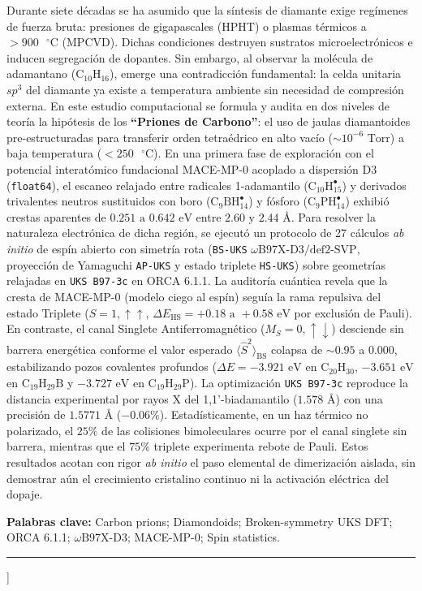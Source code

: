 \documentclass[10pt,twocolumn,a4paper]{article}
\begin{document}
\begin{@twocolumnfalse}
    \small
    Durante siete décadas se ha asumido que la síntesis de diamante exige regímenes de fuerza bruta: presiones de gigapascales (HPHT) o plasmas térmicos a $>900\text{ }^\circ\text{C}$ (MPCVD). Dichas condiciones destruyen sustratos microelectrónicos e inducen segregación de dopantes. Sin embargo, al observar la molécula de adamantano ($\text{C}_{10}\text{H}_{16}$), emerge una contradicción fundamental: la celda unitaria $sp^3$ del diamante ya existe a temperatura ambiente sin necesidad de compresión externa. En este estudio computacional se formula y audita en dos niveles de teoría la hipótesis de los \textbf{``Priones de Carbono''}: el uso de jaulas diamantoides pre-estructuradas para transferir orden tetraédrico en alto vacío ($\sim 10^{-6}\text{ Torr}$) a baja temperatura ($< 250\text{ }^\circ\text{C}$). En una primera fase de exploración con el potencial interatómico fundacional MACE-MP-0 acoplado a dispersión D3 (\texttt{float64}), el escaneo relajado entre radicales 1-adamantilo ($\text{C}_{10}\text{H}_{15}^\bullet$) y derivados trivalentes neutros sustituidos con boro ($\text{C}_9\text{BH}_{14}^\bullet$) y fósforo ($\text{C}_9\text{PH}_{14}^\bullet$) exhibió crestas aparentes de $0.251\text{ a }0.642\text{ eV}$ entre $2.60\text{ y }2.44\text{ \AA}$. Para resolver la naturaleza electrónica de dicha región, se ejecutó un protocolo de 27 cálculos \textit{ab initio} de espín abierto con simetría rota (\texttt{BS-UKS} $\omega\text{B97X-D3/def2-SVP}$, proyección de Yamaguchi \texttt{AP-UKS} y estado triplete \texttt{HS-UKS}) sobre geometrías relajadas en \texttt{UKS B97-3c} en ORCA 6.1.1. La auditoría cuántica revela que la cresta de MACE-MP-0 (modelo ciego al espín) seguía la rama repulsiva del estado Triplete ($S=1, \uparrow\uparrow$, $\Delta E_{\text{HS}} = +0.18\text{ a }+0.58\text{ eV}$ por exclusión de Pauli). En contraste, el canal Singlete Antiferromagnético ($M_S=0, \uparrow\downarrow$) desciende sin barrera energética conforme el valor esperado $\langle \hat{S}^2 \rangle_{\text{BS}}$ colapsa de $\sim 0.95$ a $0.000$, estabilizando pozos covalentes profundos ($\Delta E = -3.921\text{ eV}$ en $\text{C}_{20}\text{H}_{30}$, $-3.651\text{ eV}$ en $\text{C}_{19}\text{H}_{29}\text{B}$ y $-3.727\text{ eV}$ en $\text{C}_{19}\text{H}_{29}\text{P}$). La optimización \texttt{UKS B97-3c} reproduce la distancia experimental por rayos X del 1,1'-biadamantilo ($1.578\text{ \AA}$) con una precisión de $1.5771\text{ \AA}$ ($-0.06\%$). Estadísticamente, en un haz térmico no polarizado, el $25\%$ de las colisiones bimoleculares ocurre por el canal singlete sin barrera, mientras que el $75\%$ triplete experimenta rebote de Pauli. Estos resultados acotan con rigor \textit{ab initio} el paso elemental de dimerización aislada, sin demostrar aún el crecimiento cristalino continuo ni la activación eléctrica del dopaje.

    \vspace{0.45em}
    \noindent\textbf{Palabras clave:} Carbon prions; Diamondoids; Broken-symmetry UKS DFT; ORCA 6.1.1; $\omega\text{B97X-D3}$; MACE-MP-0; Spin statistics.
    \vspace{0.55em}
    \hrule
    \vspace{1.0em}
  \end{@twocolumnfalse}
]
\end{document}
